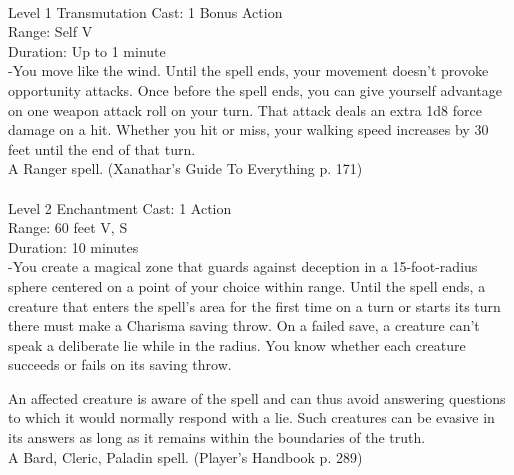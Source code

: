 \documentclass[10pt,twocolumn]{report}
\begin{document}
 \\
Level 1 \quad Transmutation \quad Cast: 1 Bonus Action\\
Range: Self \quad V\\
Duration: Up to 1 minute \quad \\
-You move like the wind. Until the spell ends, your movement doesn’t provoke opportunity attacks.
Once before the spell ends, you can give yourself advantage on one weapon attack roll on your turn. That attack deals an extra 1d8 force damage on a hit. Whether you hit or miss, your walking speed increases by 30 feet until the end of that turn.\\
A Ranger spell. (Xanathar's Guide To Everything p. 171) \\


 \\
Level 2 \quad Enchantment \quad Cast: 1 Action\\
Range: 60 feet \quad V, S\\
Duration: 10 minutes \quad \\
-You create a magical zone that guards against deception in a 15-foot-radius sphere centered on a point of your choice within range.
Until the spell ends, a creature that enters the spell’s area for the first time on a turn or starts its turn there must make a Charisma saving throw. On a failed save, a creature can’t speak a deliberate lie while in the radius. You know whether each creature succeeds or fails on its saving throw.

An affected creature is aware of the spell and can thus avoid answering questions to which it would normally respond with a lie. Such creatures can be evasive in its answers as long as it remains within the boundaries of the truth.\\
A Bard, Cleric, Paladin spell. (Player's Handbook p. 289) \\
\end{document}
